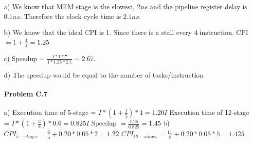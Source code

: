 \documentclass[11pt]{article}
\begin{document}
\begin{flushleft}
    a) We know that MEM stage is the slowest, $2ns$ and the pipeline register delay is $0.1ns$. Therefore the clock cycle time is $2.1ns$.
    \newline
    \newline

    b) We know that the ideal CPI is 1. Since there is a stall every 4 instruction.
    \newline
    CPI $= 1 + \frac{1}{4} = 1.25$
    \newline

    c)
    \newline
    Speedup = $\frac{I*1*7}{I*1.25*2.1} = 2.67$.
    \newline

    d)
    \newline
    The speedup would be equal to the number of tasks/instruction
\end{flushleft}   

\paragraph{\noindent\textbf{\LARGE{Problem C.7}}}


\begin{flushleft}
    a) 
    \newline
    Execution time of 5-stage = $I*(1+\frac{1}{5}) * 1 = 1.20I$
    \newline
    Execution time of 12-stage = $I*(1+\frac{3}{8}) * 0.6 = 0.825I$
    \newline
    Speedup $= \frac{1.25}{0.825} = 1.45$
    \newline
    \newline
    b)
    \newline
    $CPI_{5-stages} = \frac{6}{5} + 0.20*0.05*2 =  1.22 $
    \newline
    $CPI_{12-stages} = \frac{11}{8} + 0.20*0.05*5 =  1.425 $
\end{flushleft}   
\end{document}
